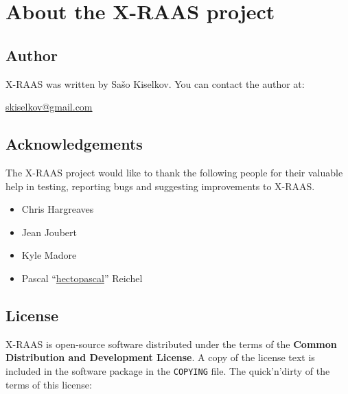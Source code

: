 \documentclass[a4paper,12pt]{article}
\begin{document}
\newpage
\section{About the X-RAAS project}
\label{sec:About}

\subsection{Author}

X-RAAS was written by Sašo Kiselkov. You can contact the author at:

\vspace{1em}

\href{mailto:skiselkov@gmail.com}{skiselkov@gmail.com}

\subsection{Acknowledgements}

The X-RAAS project would like to thank the following people for their
valuable help in testing, reporting bugs and suggesting improvements to
X-RAAS.

\begin{itemize}

\item Chris Hargreaves

\item Jean Joubert

\item Kyle Madore

\item Pascal
``\href{https://www.youtube.com/channel/UCg7RwFfTBq19oIxUkjuo_Ig}{hectopascal}''
Reichel

\end{itemize}

\subsection{License}

X-RAAS is open-source software distributed under the terms of the
\textbf{Common Distribution and Development License}. A copy of the
license text is included in the software package in the \texttt{COPYING}
file. The quick'n'dirty of the terms of this license:
\end{document}
